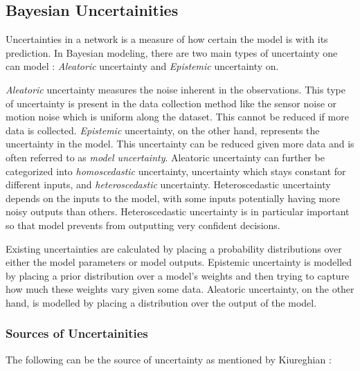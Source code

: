 \subsection{Bayesian Uncertainities}

Uncertainties in a network is a measure of how certain the model is with its prediction. In Bayesian modeling, there are two main types of uncertainty one can model \citep{der2009aleatory}: \textit{Aleatoric} uncertainty and \textit{Epistemic} uncertainty on. 

\textit{Aleatoric} uncertainty measures the noise inherent in the observations. This type of uncertainty is present in the data collection method like the sensor noise or motion noise which is uniform along the dataset. This cannot be reduced if more data is collected. \textit{Epistemic} uncertainty, on the other hand, represents the uncertainty in the model. This uncertainty can be reduced given more data and is often referred to as \textit{model uncertainty}.  Aleatoric uncertainty can further be categorized into \textit{homoscedastic} uncertainty, uncertainty which stays constant for different inputs, and \textit{heteroscedastic} uncertainty. Heteroscedastic uncertainty depends on the inputs to the model, with some inputs potentially having more noisy outputs than others. Heteroscedastic uncertainty is in particular important so that model prevents from outputting very confident decisions.

Existing uncertainties are calculated by placing a probability distributions over either the model parameters or model outputs. Epistemic uncertainty is modelled by placing a prior distribution over a model's weights and then trying to capture how much these weights vary given some data. Aleatoric uncertainty, on the other hand, is modelled by placing a distribution over the output of the model.

\subsubsection{Sources of Uncertainities}

The following can be the source of uncertainty as mentioned by Kiureghian \cite{Kiureghian}:

